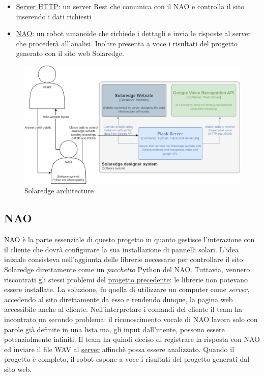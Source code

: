 \documentclass{optica-article}
\begin{document}
\begin{itemize}
    \item \hyperref[sec:solaedge_server]{Server HTTP}: un server Rest che comunica con il NAO e controlla il sito inserendo i dati richiesti
    \item \hyperref[sec:solaredge_nao]{NAO}: un robot umanoide che richiede i dettagli e invia le risposte al server che procederà all'analisi. Inoltre presenta a voce i risultati del progetto generato con il sito web Solaredge.
\end{itemize}

\begin{figure}[!htbp]
    \centering
    \includegraphics[scale=0.23]{figures/architecture_solaredge.png}
    \caption{Solaredge architecture}
    \label{fig:architecture_solaredge}
\end{figure}

\subsection{NAO}\label{sec:solaredge_nao}
NAO è la parte essenziale di questo progetto in quanto gestisce l'interazione con il cliente che dovrà configurare la sua installazione di pannelli solari. L'idea iniziale consisteva nell'aggiunta delle librerie necessarie per controllare il sito Solaredge direttamente come un \emph{pacchetto} Python del NAO. Tuttavia, vennero riscontrati gli stessi problemi del \hyperref[sec:domotics_server]{progetto precedente}: le librerie non potevano essere installate. La soluzione, fu quella di utilizzare un computer come \emph{server}, accedendo al sito direttamente da esso e rendendo dunque, la pagina web accessibile anche al cliente. Nell'interpretare i comandi del cliente il team ha incontrato un secondo problema: il riconoscimento vocale di NAO lavora solo con parole già definite in una lista ma, gli input dall'utente, possono essere potenzialmente infiniti. Il team ha quindi deciso di registrare la risposta con NAO ed inviare il file WAV al \hyperref[sec:solaedge_server]{server} affinchè possa essere analizzato. Quando il progetto è completo, il robot espone a voce i risultati del progetto generati dal sito web.
\end{document}
